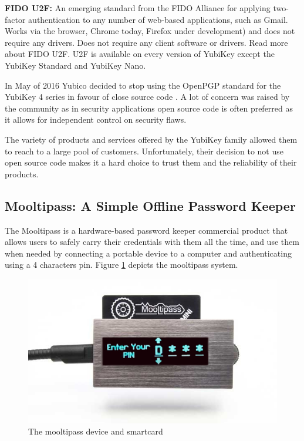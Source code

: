 \textbf{FIDO U2F: }
An emerging standard from the FIDO Alliance for applying two-factor authentication to any number of web-based applications, such as Gmail. Works via the browser, Chrome today, Firefox under development) and does not require any drivers. Does not require any client software or drivers. Read more about FIDO U2F.  U2F is available on every version of YubiKey except the YubiKey Standard and YubiKey Nano.

\vspace{10pt}


In May of 2016 Yubico decided to stop using the OpenPGP standard for the YubiKey 4 series in favour of close source code \cite{yubiopen}. A lot of concern was raised by the community as in security applications open source code is often preferred as it allows for independent control on security flaws.

The variety of products and services offered by the YubiKey family allowed them to reach to a large pool of customers. Unfortunately, their decision to not use open source code makes it a hard choice to trust them and the reliability of their products.


\subsection{Mooltipass: A Simple Offline Password Keeper} 

The Mooltipass is a hardware-based password keeper commercial product that allows users to safely carry their credentials with them all the time, and use them when needed by connecting a portable device to a computer and authenticating using a 4 characters pin. 
Figure \ref{fig:mool} depicts the mooltipass system.

\begin{figure}[htb]
  \centering
  \captionsetup{justification=centering}
  \centerline{\includegraphics[width=0.6\columnwidth]{chapters/figures/related/mooltipass.jpg}}
  \caption{The mooltipass device and smartcard}
  \label{fig:mool}
\end{figure}

